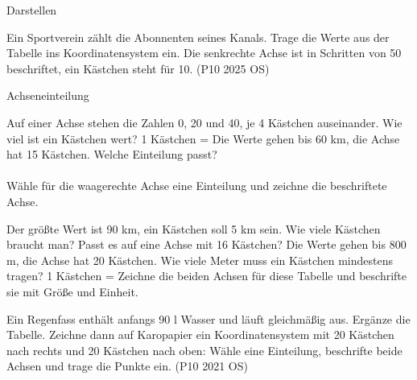 \begin{aufgabe}{Darstellen}
\begin{teile}
 \begin{ksys}[xmin=0,xmax=7,ymin=0,ymax=7,xlabel=Zeit in h,ylabel=Weg in km]\end{ksys}
\teil Ein Sportverein zählt die Abonnenten seines Kanals. Trage die Werte aus der Tabelle ins Koordinatensystem ein. Die senkrechte Achse ist in Schritten von 50 beschriftet, ein Kästchen steht für 10. \hfill (P10 2025 OS)

 \begin{ksys}[xmin=0,xmax=5,ymin=0,ymax=300,ystep=50,xlabel=Zeit in Monaten,ylabel=Abonnenten]\end{ksys}
\end{teile}
\end{aufgabe}

\begin{aufgabe}{Achseneinteilung}
\begin{teile}
\teil Auf einer Achse stehen die Zahlen 0, 20 und 40, je 4 Kästchen auseinander. Wie viel ist ein Kästchen wert? 1 Kästchen = \leerfeld
\teil Die Werte gehen bis 60 km, die Achse hat 15 Kästchen. Welche Einteilung passt? \\  \\ 
\teil Wähle für die waagerechte Achse eine Einteilung und zeichne die beschriftete Achse.

\teil Der größte Wert ist 90 km, ein Kästchen soll 5 km sein. Wie viele Kästchen braucht man? Passt es auf eine Achse mit 16 Kästchen? \leerfeld[Kästchen]
\teil Die Werte gehen bis 800 m, die Achse hat 20 Kästchen. Wie viele Meter muss ein Kästchen mindestens tragen? 1 Kästchen = \leerfeld[m]
\teil Zeichne die beiden Achsen für diese Tabelle und beschrifte sie mit Größe und Einheit.

\teil Ein Regenfass enthält anfangs 90 l Wasser und läuft gleichmäßig aus. Ergänze die Tabelle. Zeichne dann auf Karopapier ein Koordinatensystem mit 20 Kästchen nach rechts und 20 Kästchen nach oben: Wähle eine Einteilung, beschrifte beide Achsen und trage die Punkte ein. \hfill (P10 2021 OS)

\end{teile}
\end{aufgabe}

